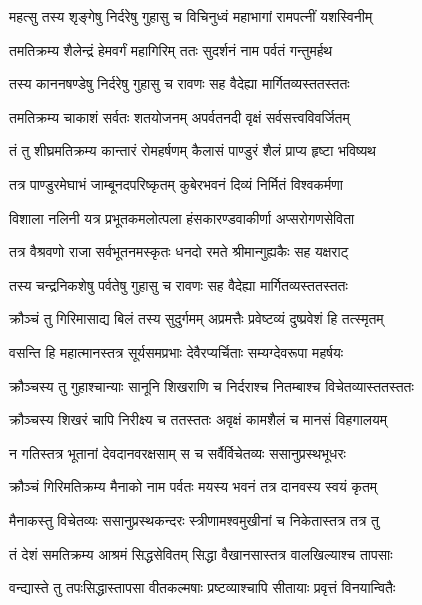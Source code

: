 \twolineshloka
{महत्सु तस्य शृङ्गेषु निर्दरेषु गुहासु च}
{विचिनुध्वं महाभागां रामपत्नीं यशस्विनीम्} %

\twolineshloka
{तमतिक्रम्य शैलेन्द्रं हेमवर्गं महागिरिम्}
{ततः सुदर्शनं नाम पर्वतं गन्तुमर्हथ} %

\twolineshloka
{तस्य काननषण्डेषु निर्दरेषु गुहासु च}
{रावणः सह वैदेह्या मार्गितव्यस्ततस्ततः} %

\twolineshloka
{तमतिक्रम्य चाकाशं सर्वतः शतयोजनम्}
{अपर्वतनदी वृक्षं सर्वसत्त्वविवर्जितम्} %

\twolineshloka
{तं तु शीघ्रमतिक्रम्य कान्तारं रोमहर्षणम्}
{कैलासं पाण्डुरं शैलं प्राप्य हृष्टा भविष्यथ} %

\twolineshloka
{तत्र पाण्डुरमेघाभं जाम्बूनदपरिष्कृतम्}
{कुबेरभवनं दिव्यं निर्मितं विश्वकर्मणा} %

\twolineshloka
{विशाला नलिनी यत्र प्रभूतकमलोत्पला}
{हंसकारण्डवाकीर्णा अप्सरोगणसेविता} %

\twolineshloka
{तत्र वैश्रवणो राजा सर्वभूतनमस्कृतः}
{धनदो रमते श्रीमान्गुह्यकैः सह यक्षराट्} %

\twolineshloka
{तस्य चन्द्रनिकशेषु पर्वतेषु गुहासु च}
{रावणः सह वैदेह्या मार्गितव्यस्ततस्ततः} %

\twolineshloka
{क्रौञ्चं तु गिरिमासाद्य बिलं तस्य सुदुर्गमम्}
{अप्रमत्तैः प्रवेष्टव्यं दुष्प्रवेशं हि तत्स्मृतम्} %

\twolineshloka
{वसन्ति हि महात्मानस्तत्र सूर्यसमप्रभाः}
{देवैरप्यर्चिताः सम्यग्देवरूपा महर्षयः} %

\twolineshloka
{क्रौञ्चस्य तु गुहाश्चान्याः सानूनि शिखराणि च}
{निर्दराश्च नितम्बाश्च विचेतव्यास्ततस्ततः} %

\twolineshloka
{क्रौञ्चस्य शिखरं चापि निरीक्ष्य च ततस्ततः}
{अवृक्षं कामशैलं च मानसं विहगालयम्} %

\twolineshloka
{न गतिस्तत्र भूतानां देवदानवरक्षसाम्}
{स च सर्वैर्विचेतव्यः ससानुप्रस्थभूधरः} %

\twolineshloka
{क्रौञ्चं गिरिमतिक्रम्य मैनाको नाम पर्वतः}
{मयस्य भवनं तत्र दानवस्य स्वयं कृतम्} %

\twolineshloka
{मैनाकस्तु विचेतव्यः ससानुप्रस्थकन्दरः}
{स्त्रीणामश्वमुखीनां च निकेतास्तत्र तत्र तु} %

\twolineshloka
{तं देशं समतिक्रम्य आश्रमं सिद्धसेवितम्}
{सिद्धा वैखानसास्तत्र वालखिल्याश्च तापसाः} %

\twolineshloka
{वन्द्यास्ते तु तपःसिद्धास्तापसा वीतकल्मषाः}
{प्रष्टव्याश्चापि सीतायाः प्रवृत्तं विनयान्वितैः} %


